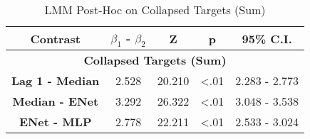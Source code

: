 \begin{table}[h]
\centering
\caption{LMM Post-Hoc on Collapsed Targets (Sum)}
\label{collapsed_target_lmm_post_hoc}
\begin{tabular}{ccccc}
\hline
\textbf{Contrast}           & \textbf{$\beta_1$ - $\beta_2$} & \textbf{Z} & \textbf{p} & \textbf{95\% C.I.} \\ \hline
\multicolumn{5}{c}{\textbf{Collapsed Targets (Sum)}}                                                 \\ \hline
\textbf{Lag 1 - Median} & 2.528                & 20.210     & \textless .01   & 2.283 - 2.773      \\
\textbf{Median - ENet}          & 3.292                 & 26.322     & \textless .01   & 3.048 - 3.538        \\
\textbf{ENet - MLP}          & 2.778                 & 22.211     & \textless .01   & 2.533 - 3.024        \\ \hline
\end{tabular}
\end{table}